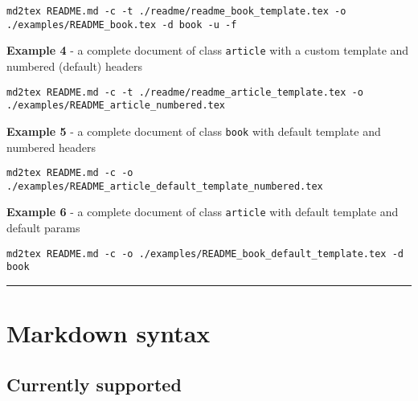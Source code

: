 \documentclass[a4paper, 12pt, twoside]{book}
\begin{document}
\begin{listing}[h!]
   \begin{verbatim}
md2tex README.md -c -t ./readme/readme_book_template.tex -o ./examples/README_book.tex -d book -u -f

   \end{verbatim}
\end{listing}

\textbf{Example 4} - a complete document of class \texttt{article} with a custom template and numbered (default) headers

\begin{listing}[h!]
   \begin{verbatim}
md2tex README.md -c -t ./readme/readme_article_template.tex -o ./examples/README_article_numbered.tex

   \end{verbatim}
\end{listing}

\textbf{Example 5} - a complete document of class \texttt{book} with default template and numbered headers

\begin{listing}[h!]
   \begin{verbatim}
md2tex README.md -c -o ./examples/README_article_default_template_numbered.tex

   \end{verbatim}
\end{listing}

\textbf{Example 6} - a complete document of class \texttt{article} with default template and default params

\begin{listing}[h!]
   \begin{verbatim}
md2tex README.md -c -o ./examples/README_book_default_template.tex -d book

   \end{verbatim}
\end{listing}

\par\noindent\rule{\linewidth}{0.4pt}
\section*{Markdown syntax}
\subsection*{Currently supported}
\end{document}
